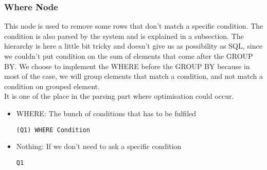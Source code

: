 \documentclass{article}
\begin{document}
\subsubsection{Where Node}
This node is used to remove some rows that don't match a specific condition. The condition is also parsed by the system and is explained in a subsection. The hierarchy is here a little bit tricky and doesn't give us as possibility as SQL, since we couldn't put condition on the sum of elements that come after the GROUP BY. We choose to implement the WHERE before the GROUP BY because in most of the case, we will group elements that match a condition, and not match a condition on grouped element. \\ It is one of the place in the parsing part where optimisation could occur.
\begin{itemize}
\item WHERE: The bunch of conditions that has to be fulfiled 
\begin{verbatim}
(Q1) WHERE Condition
\end{verbatim}
\item Nothing:  If we don't need to ask a specific condition
\begin{verbatim}
Q1
\end{verbatim}
\end{itemize}
\end{document}
